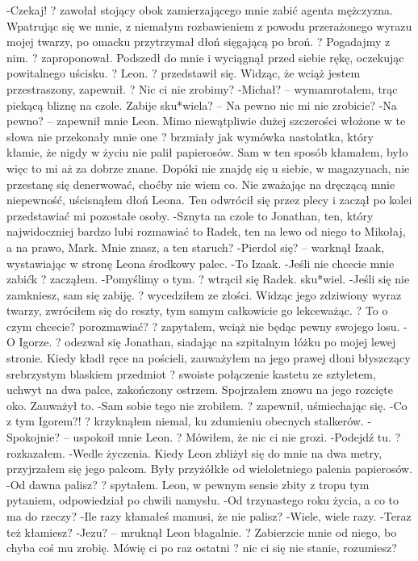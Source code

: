 \documentclass[../MAIN.tex]{subfiles}
\begin{document}
-Czekaj! ? zawołał stojący obok zamierzającego mnie zabić agenta mężczyzna. Wpatrując się we mnie, z niemałym rozbawieniem z powodu przerażonego wyrazu mojej twarzy, po omacku przytrzymał dłoń sięgającą po broń. ? Pogadajmy z nim. ? zaproponował. Podszedł do mnie i wyciągnął przed siebie rękę, oczekując powitalnego uścisku. ? Leon. ? przedstawił się. Widząc, że wciąż jestem przestraszony, zapewnił. ? Nic ci nie zrobimy?
-Michał? -- wymamrotałem, trąc piekącą bliznę na czole. Zabije sku*wiela? -- Na pewno nic mi nie zrobicie?
-Na pewno? -- zapewnił mnie Leon.
Mimo niewątpliwie dużej szczerości włożone w te słowa nie przekonały mnie one ? brzmiały jak wymówka nastolatka, który kłamie, że nigdy w życiu nie palił papierosów. Sam w ten sposób kłamałem, było więc to mi aż za dobrze znane.
Dopóki nie znajdę się u siebie, w magazynach, nie przestanę się denerwować, choćby nie wiem co.
Nie zważając na dręczącą mnie niepewność, uścisnąłem dłoń Leona. Ten odwrócił się przez plecy i zaczął po kolei przedstawiać mi pozostałe osoby.
-Sznyta na czole to Jonathan, ten, który najwidoczniej bardzo lubi rozmawiać to Radek, ten na lewo od niego to Mikołaj, a na prawo, Mark. Mnie znasz, a ten staruch?
-Pierdol się? -- warknął Izaak, wystawiając w stronę Leona środkowy palec.
-To Izaak.
-Jeśli nie chcecie mnie zabić\3k ? zacząłem.
-Pomyślimy o tym. ? wtrącił się Radek.
sku*wiel.
-Jeśli się nie zamkniesz, sam się zabiję. ? wycedziłem ze złości. Widząc jego zdziwiony wyraz twarzy, zwróciłem się do reszty, tym samym całkowicie go lekceważąc. ? To o czym chcecie? porozmawiać? ? zapytałem, wciąż nie będąc pewny swojego losu.
-O Igorze. ? odezwał się Jonathan, siadając na szpitalnym łóżku po mojej lewej stronie. Kiedy kładł ręce na pościeli, zauważyłem na jego prawej dłoni błyszczący srebrzystym blaskiem przedmiot ? swoiste połączenie kastetu ze sztyletem, uchwyt na dwa palce, zakończony ostrzem.
Spojrzałem znowu na jego rozcięte oko. Zauważył to.
-Sam sobie tego nie zrobiłem. ? zapewnił, uśmiechając się.
-Co z tym Igorem?! ? krzyknąłem niemal, ku zdumieniu obecnych stalkerów.
-Spokojnie? -- uspokoił mnie Leon. ? Mówiłem, że nic ci nie grozi.
-Podejdź tu. ? rozkazałem.
-Wedle życzenia.
Kiedy Leon zbliżył się do mnie na dwa metry, przyjrzałem się jego palcom.
Były przyżółkłe od wieloletniego palenia papierosów.
-Od dawna palisz? ? spytałem. Leon, w pewnym sensie zbity z tropu tym pytaniem, odpowiedział po chwili namysłu.
-Od trzynastego roku życia, a co to ma do rzeczy?
-Ile razy kłamałeś mamusi, że nie palisz?
-Wiele, wiele razy.
-Teraz też kłamiesz?
-Jezu? -- mruknął Leon błagalnie. ? Zabierzcie mnie od niego, bo chyba coś mu zrobię. Mówię ci po raz ostatni ? nic ci się nie stanie, rozumiesz?
\end{document}
